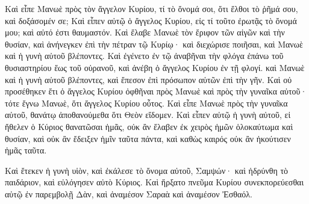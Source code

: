 {Καὶ εἶπε Μανωὲ πρὸς τὸν ἄγγελον Κυρίου, τί τὸ ὄνομά σοι, ὅτι ἔλθοι τὸ ῥῆμά σου, καὶ δοξάσομέν σε;
Καὶ εἶπεν αὐτῷ ὁ ἄγγελος Κυρίου, εἰς τί τοῦτο ἐρωτᾷς τὸ ὄνομά μου; καὶ αὐτό ἐστι θαυμαστόν.
Καὶ ἔλαβε Μανωὲ τὸν ἔριφον τῶν αἰγῶν καὶ τὴν θυσίαν, καὶ ἀνήνεγκεν ἐπὶ τὴν πέτραν τῷ Κυρίῳ· καὶ διεχώρισε ποιῆσαι, καὶ Μανωὲ καὶ ἡ γυνὴ αὐτοῦ βλέποντες.
Καὶ ἐγένετο ἐν τῷ ἀναβῆναι τὴν φλόγα ἐπάνω τοῦ θυσιαστηρίου ἕως τοῦ οὐρανοῦ, καὶ ἀνέβη ὁ ἄγγελος Κυρίου ἐν τῇ φλογί. καὶ Μανωὲ καὶ ἡ γυνὴ αὐτοῦ βλέποντες, καὶ ἔπεσον ἐπὶ πρόσωπον αὐτῶν ἐπὶ τὴν γῆν.
Καὶ οὐ προσέθηκεν ἔτι ὁ ἄγγελος Κυρίου ὀφθῆναι πρὸς Μανωὲ καὶ πρὸς τὴν γυναῖκα αὐτοῦ· τότε ἔγνω Μανωὲ, ὅτι ἄγγελος Κυρίου οὗτος.
Καὶ εἶπε Μανωὲ πρὸς τὴν γυναῖκα αὐτοῦ, θανάτῳ ἀποθανούμεθα ὅτι Θεὸν εἴδομεν.
Καὶ εἶπεν αὐτῷ ἡ γυνὴ αὐτοῦ, εἰ ἤθελεν ὁ Κύριος θανατῶσαι ἡμᾶς, οὐκ ἂν ἔλαβεν ἐκ χειρὸς ἡμῶν ὁλοκαύτωμα καὶ θυσίαν, καὶ οὐκ ἂν ἔδειξεν ἡμῖν ταῦτα πάντα, καὶ καθὼς καιρός οὐκ ἂν ἠκούτισεν ἡμᾶς ταῦτα.
\par }{\PP {}Καὶ ἔτεκεν ἡ γυνὴ υἱὸν, καὶ ἐκάλεσε τὸ ὄνομα αὐτοῦ, Σαμψών· καὶ ἡδρύνθη τὸ παιδάριον, καὶ εὐλόγησεν αὐτὸ Κύριος.
Καὶ ἤρξατο πνεῦμα Κυρίου συνεκπορεύεσθαι αὐτῷ ἐν παρεμβολῇ Δὰν, καὶ ἀναμέσον Σαραὰ καὶ ἀναμέσον Ἐσθαόλ.

}

